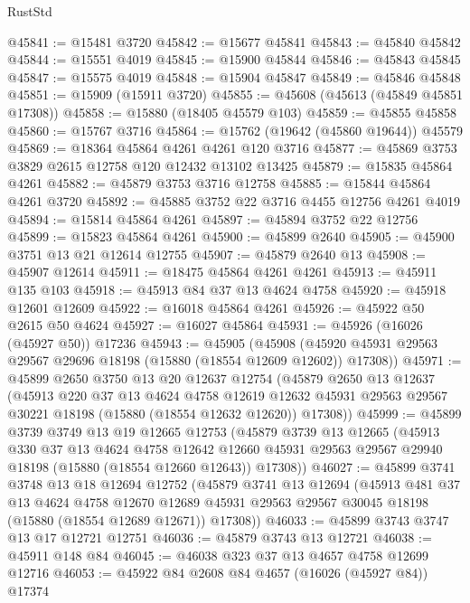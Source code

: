 \begin{lexlean}{RustStd}
\begin{coremodule}
@45841 := @15481 @3720
@45842 := @15677 @45841
@45843 := @45840 @45842
@45844 := @15551 @4019
@45845 := @15900 @45844
@45846 := @45843 @45845
@45847 := @15575 @4019
@45848 := @15904 @45847
@45849 := @45846 @45848
@45851 := @15909 (@15911 @3720)
@45855 := @45608 (@45613 (@45849 @45851 @17308))
@45858 := @15880 (@18405 @45579 @103)
@45859 := @45855 @45858
@45860 := @15767 @3716
@45864 := @15762 (@19642 (@45860 @19644)) @45579
@45869 := @18364 @45864 @4261 @4261 @120 @3716
@45877 := @45869 @3753 @3829 @2615 @12758 @120 @12432 @13102 @13425
@45879 := @15835 @45864 @4261
@45882 := @45879 @3753 @3716 @12758
@45885 := @15844 @45864 @4261 @3720
@45892 := @45885 @3752 @22 @3716 @4455 @12756 @4261 @4019
@45894 := @15814 @45864 @4261
@45897 := @45894 @3752 @22 @12756
@45899 := @15823 @45864 @4261
@45900 := @45899 @2640
@45905 := @45900 @3751 @13 @21 @12614 @12755
@45907 := @45879 @2640 @13
@45908 := @45907 @12614
@45911 := @18475 @45864 @4261 @4261
@45913 := @45911 @135 @103
@45918 := @45913 @84 @37 @13 @4624 @4758
@45920 := @45918 @12601 @12609
@45922 := @16018 @45864 @4261
@45926 := @45922 @50 @2615 @50 @4624
@45927 := @16027 @45864
@45931 := @45926 (@16026 (@45927 @50)) @17236
@45943 := @45905
    (@45908 (@45920 @45931 @29563 @29567 @29696 @18198 (@15880 (@18554 @12609 @12602)) @17308))
@45971 := @45899
    @2650
    @3750
    @13
    @20
    @12637
    @12754
    (@45879
      @2650
      @13
      @12637
      (@45913
        @220
        @37
        @13
        @4624
        @4758
        @12619
        @12632
        @45931
        @29563
        @29567
        @30221
        @18198
        (@15880 (@18554 @12632 @12620))
        @17308))
@45999 := @45899
    @3739
    @3749
    @13
    @19
    @12665
    @12753
    (@45879
      @3739
      @13
      @12665
      (@45913
        @330
        @37
        @13
        @4624
        @4758
        @12642
        @12660
        @45931
        @29563
        @29567
        @29940
        @18198
        (@15880 (@18554 @12660 @12643))
        @17308))
@46027 := @45899
    @3741
    @3748
    @13
    @18
    @12694
    @12752
    (@45879
      @3741
      @13
      @12694
      (@45913
        @481
        @37
        @13
        @4624
        @4758
        @12670
        @12689
        @45931
        @29563
        @29567
        @30045
        @18198
        (@15880 (@18554 @12689 @12671))
        @17308))
@46033 := @45899 @3743 @3747 @13 @17 @12721 @12751
@46036 := @45879 @3743 @13 @12721
@46038 := @45911 @148 @84
@46045 := @46038 @323 @37 @13 @4657 @4758 @12699 @12716
@46053 := @45922 @84 @2608 @84 @4657 (@16026 (@45927 @84)) @17374

\end{coremodule}
\end{lexlean}
